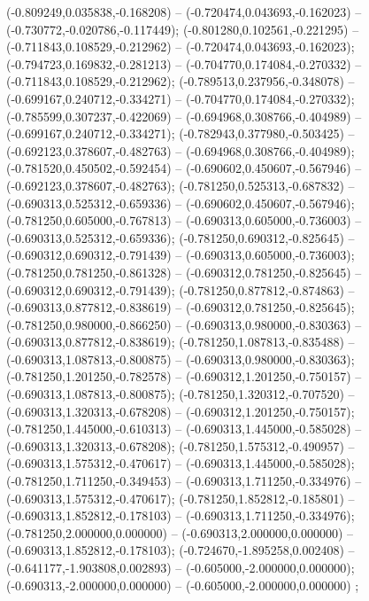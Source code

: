  (-0.809249,0.035838,-0.168208) -- (-0.720474,0.043693,-0.162023) -- (-0.730772,-0.020786,-0.117449);
 (-0.801280,0.102561,-0.221295) -- (-0.711843,0.108529,-0.212962) -- (-0.720474,0.043693,-0.162023);
 (-0.794723,0.169832,-0.281213) -- (-0.704770,0.174084,-0.270332) -- (-0.711843,0.108529,-0.212962);
 (-0.789513,0.237956,-0.348078) -- (-0.699167,0.240712,-0.334271) -- (-0.704770,0.174084,-0.270332);
 (-0.785599,0.307237,-0.422069) -- (-0.694968,0.308766,-0.404989) -- (-0.699167,0.240712,-0.334271);
 (-0.782943,0.377980,-0.503425) -- (-0.692123,0.378607,-0.482763) -- (-0.694968,0.308766,-0.404989);
 (-0.781520,0.450502,-0.592454) -- (-0.690602,0.450607,-0.567946) -- (-0.692123,0.378607,-0.482763);
 (-0.781250,0.525313,-0.687832) -- (-0.690313,0.525312,-0.659336) -- (-0.690602,0.450607,-0.567946);
 (-0.781250,0.605000,-0.767813) -- (-0.690313,0.605000,-0.736003) -- (-0.690313,0.525312,-0.659336);
 (-0.781250,0.690312,-0.825645) -- (-0.690312,0.690312,-0.791439) -- (-0.690313,0.605000,-0.736003);
 (-0.781250,0.781250,-0.861328) -- (-0.690312,0.781250,-0.825645) -- (-0.690312,0.690312,-0.791439);
 (-0.781250,0.877812,-0.874863) -- (-0.690313,0.877812,-0.838619) -- (-0.690312,0.781250,-0.825645);
 (-0.781250,0.980000,-0.866250) -- (-0.690313,0.980000,-0.830363) -- (-0.690313,0.877812,-0.838619);
 (-0.781250,1.087813,-0.835488) -- (-0.690313,1.087813,-0.800875) -- (-0.690313,0.980000,-0.830363);
 (-0.781250,1.201250,-0.782578) -- (-0.690312,1.201250,-0.750157) -- (-0.690313,1.087813,-0.800875);
 (-0.781250,1.320312,-0.707520) -- (-0.690313,1.320313,-0.678208) -- (-0.690312,1.201250,-0.750157);
 (-0.781250,1.445000,-0.610313) -- (-0.690313,1.445000,-0.585028) -- (-0.690313,1.320313,-0.678208);
 (-0.781250,1.575312,-0.490957) -- (-0.690313,1.575312,-0.470617) -- (-0.690313,1.445000,-0.585028);
 (-0.781250,1.711250,-0.349453) -- (-0.690313,1.711250,-0.334976) -- (-0.690313,1.575312,-0.470617);
 (-0.781250,1.852812,-0.185801) -- (-0.690313,1.852812,-0.178103) -- (-0.690313,1.711250,-0.334976);
 (-0.781250,2.000000,0.000000) -- (-0.690313,2.000000,0.000000) -- (-0.690313,1.852812,-0.178103);
 (-0.724670,-1.895258,0.002408) -- (-0.641177,-1.903808,0.002893) -- (-0.605000,-2.000000,0.000000);
 (-0.690313,-2.000000,0.000000) -- (-0.605000,-2.000000,0.000000) ;
